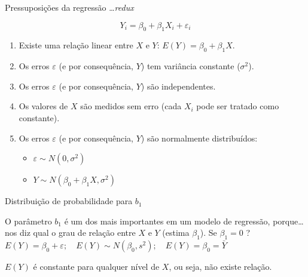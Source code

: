 \documentclass{beamer}\usepackage[]{graphicx}\usepackage[]{color}
\begin{document}
\begin{frame}{Pressuposições da regressão \ldots \emph{redux}}

\begin{equation*}
Y_i = \beta _0 + \beta _1 X_i + \varepsilon _i
\end{equation*} \pause

\begin{small}

\begin{enumerate}
  \item Existe uma relação linear entre $X$ e $Y$: $E(Y) = \beta _0 + \beta _1 X$. \pause
  \vfill
  \item Os erros $\varepsilon$ (e por consequência, $Y$) tem variância constante ($\sigma^2$). \pause
  \vfill
  \item Os erros $\varepsilon$ (e por consequência, $Y$) são independentes. \pause
  \vfill
  \item Os valores de $X$ são medidos sem erro (cada $X_i$ pode ser tratado como constante). \pause
  \vfill
  \item \alert{Os erros $\varepsilon$ (e por consequência, $Y$) são normalmente distribuídos:}
  \vfill
  \begin{itemize}
    \item \alert{$\varepsilon \sim N(0,\sigma^2)$}
    \vfill
    \item  \alert{$Y \sim N(\beta _0 + \beta _1 X,\sigma^2)$}
  \end{itemize}
\end{enumerate}

\end{small}
  
\end{frame}

\begin{frame}{Distribuição de probabilidade para $b_1$}

O parâmetro $b_1$ é um dos mais importantes em um modelo de regressão, porque\ldots \pause
nos diz qual o grau de relação entre $X$ e $Y$ (estima $\beta_1$). \pause
\vfill
Se $\beta_1 = 0$ ? \pause
\vfill
$E(Y) = \beta_0 + \varepsilon; \quad E(Y) \sim N(\beta_0, s^2); \quad E(Y) = \beta_0 = \bar{Y}$\pause

\vfill
$E(Y)$ é constante para qualquer nível de $X$, ou seja, não existe relação.

\end{frame}
\end{document}
